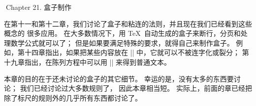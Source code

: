 


\beginchapter Chapter 21. 盒子制作


\1在第十一和第十二章，我们讨论了盒子和粘连的法则，并且现在我们已经看到这些概念的%
很多应用。%
在大多数情况下，用 \TeX\ 自动生成的盒子来断行，分页和处理数学公式就可以了；
但是如果要满足特殊的要求，就得自己来制作盒子。%
例如，第十四章指出，如果把某些内容放在 |\hbox| 中，它就可以不被连字化或裂分；
第十九章指出，在陈列方程中可以用 |\hbox| 来得到普通文本。

\danger 本章的目的在于还未讨论的盒子的其它细节。%
幸运的是，没有太多的东西要讨论；
我们已经讨论过大多数规则了，
因此本章相当短。%
实际上，前面的章已经把除了标尺的规则外的几乎所有东西都讨论了。

